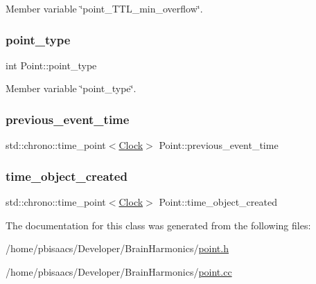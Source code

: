 Member variable \char`\"{}point\+\_\+\+T\+T\+L\+\_\+min\+\_\+overflow\char`\"{}. 

\mbox{\label{classPoint_aa672daab7c7949e840dfe79980d162b5}} 
\subsubsection{\texorpdfstring{point\+\_\+type}{point\_type}}
{\footnotesize\ttfamily int Point\+::point\+\_\+type\hspace{0.3cm}{\ttfamily [private]}}



Member variable \char`\"{}point\+\_\+type\char`\"{}. 

\mbox{\label{classPoint_abdae57027e086386d297d503feba1b41}} 
\subsubsection{\texorpdfstring{previous\+\_\+event\+\_\+time}{previous\_event\_time}}
{\footnotesize\ttfamily std\+::chrono\+::time\+\_\+point$<$\mbox{\hyperlink{universe_8h_a0ef8d951d1ca5ab3cfaf7ab4c7a6fd80}{Clock}}$>$ Point\+::previous\+\_\+event\+\_\+time\hspace{0.3cm}{\ttfamily [private]}}

\mbox{\label{classPoint_a7d06d004516b58e6a6d85a35e689b28a}} 
\subsubsection{\texorpdfstring{time\+\_\+object\+\_\+created}{time\_object\_created}}
{\footnotesize\ttfamily std\+::chrono\+::time\+\_\+point$<$\mbox{\hyperlink{universe_8h_a0ef8d951d1ca5ab3cfaf7ab4c7a6fd80}{Clock}}$>$ Point\+::time\+\_\+object\+\_\+created\hspace{0.3cm}{\ttfamily [private]}}



The documentation for this class was generated from the following files\+:\begin{DoxyCompactItemize}
\item 
/home/pbisaacs/\+Developer/\+Brain\+Harmonics/\mbox{\hyperlink{point_8h}{point.\+h}}\item 
/home/pbisaacs/\+Developer/\+Brain\+Harmonics/\mbox{\hyperlink{point_8cc}{point.\+cc}}\end{DoxyCompactItemize}
